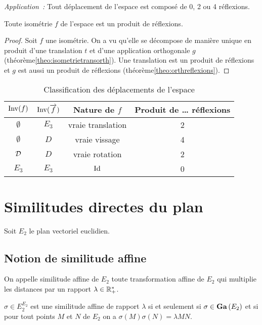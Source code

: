 \emph{Application~:} Tout déplacement de l'espace est composé de 0, 2 ou 4
réflexions.

\begin{cor}
  Toute isométrie \(f\) de l'espace est un produit de réflexions.
\end{cor}
\begin{proof}
  Soit \(f\) une isométrie. On a vu qu'elle se décompose de manière unique en
  produit d'une translation \(t\) et d'une application orthogonale \(g\)
  (théorème\ref{theo:isometrietransorth}). Une translation est un produit de réflexions
  et \(g\) est aussi un produit de réflexions (théorème\ref{theo:orthreflexions}).
\end{proof}

\begin{table}
  \centering
  \begin{tabular}{|c|c|c|c|}\hline
    \(\operatorname{Inv}(f)\) & \(\operatorname{Inv}(\overrightarrow{f})\) & Nature de \(f\) & Produit de \ldots
    réflexions \\ \hline
    \(\emptyset\) & \(E_3\) & vraie translation & 2 \\
    \(\emptyset\) & \(D\) & vraie vissage & 4 \\
    \(\mathcal{D}\) & \(D\)& vraie rotation & 2 \\
    \(E_3\) & \(E_3\) & \(\operatorname{Id}\) & 0 \\ \hline
  \end{tabular}
  \caption{Classification des déplacements de l'espace}
  \label{tab:classdéplacementsespace}
\end{table}

\section{Similitudes directes du plan}

Soit \(E_2\) le plan vectoriel euclidien.

\subsection{Notion de similitude affine}

\begin{defdef}
  On appelle similitude affine de \(E_2\) toute transformation affine de \(E_2\)
  qui multiplie les distances par un rapport \(\lambda \in \mathbb{R}_{+}^{*}\).

  \(\sigma \in E_2^{E_2}\) est une similitude affine de rapport \(\lambda\) si
  et seulement si \(\sigma \in \mathbf{Ga}\left(E_2\right)\) et si pour tout points \(M\) et \(N\)
  de \(E_2\) on a \(\sigma(M)\sigma(N)=\lambda MN\).
\end{defdef}

